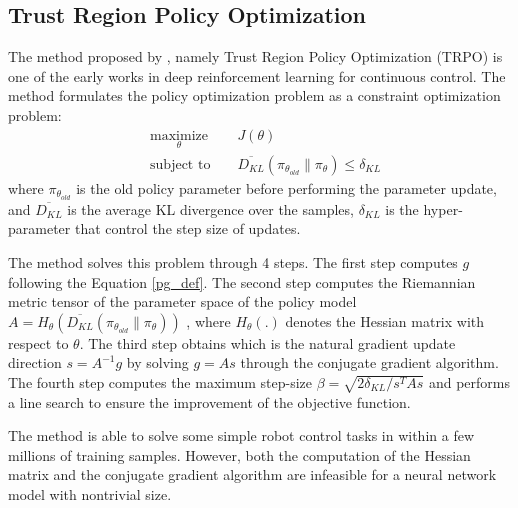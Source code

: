 \subsection{Trust Region Policy Optimization}
The method proposed by \cite{schulman2015trust}, namely Trust Region Policy Optimization (TRPO) is one of the early works in deep reinforcement learning for continuous control. The method formulates the policy optimization problem as a constraint optimization problem:
\begin{equation}
    \begin{aligned}
&    \underset{\theta}{\text{maximize}} 
&& J(\theta) \\
& \text{subject to } 
&& \overline{D_{KL}}(\pi_{\theta_{old}}\|\pi_\theta) \leq \delta_{KL}\label{trpo_obj}\end{aligned}
\end{equation}
where $\pi_{\theta_{old}}$ is the old policy parameter before performing the parameter update, and $\overline{D_{KL}}$ is the average KL divergence over the samples, $\delta_{KL}$ is the hyper-parameter that control the step size of updates.

The method solves this problem through 4 steps. The first step computes $g$ following the Equation \ref{pg_def}. 
The second step computes the Riemannian metric tensor of the parameter space of the policy model $A = H_{\theta}\left(\overline{D_{KL}}(\pi_{\theta_{old}}\|\pi_\theta)\right)$ , where $H_{\theta}(.)$ denotes the Hessian matrix with respect to $\theta$. 
The third step obtains which is the natural gradient update direction $s=A^{-1}g$ by solving $g=As$ through the conjugate gradient algorithm.
The fourth step computes the maximum step-size $\beta= \sqrt{2\delta_{KL}/s^TAs}$ and performs a line search to ensure the improvement of the objective function.

The method is able to solve some simple robot control tasks in \cite{openaigym} within a few millions of training samples. However, both the computation of the Hessian matrix and the conjugate gradient algorithm are infeasible for a neural network model with nontrivial size.

